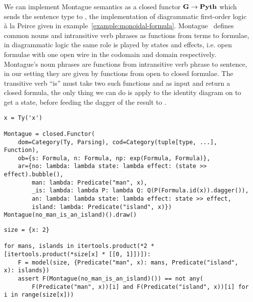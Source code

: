 \begin{example}
We can implement Montague semantics as a closed functor $\mathbf{G} \to \mathbf{Pyth}$ which sends the sentence type to , the implementation of diagrammatic first-order logic à la Peirce given in example~\ref{example:monoidal-formula}.
Montague~\cite{Montague73} defines common nouns and intransitive verb phrases as functions from terms to formulae, in diagrammatic logic the same role is played by states and effects, i.e. open formulae with one open wire  in the codomain and domain respectively.
Montague's noun phrases are functions from intransitive verb phrase to sentence, in our setting they are given by functions from open to closed formulae.
The transitive verb ``is'' must take two such functions  and  as input and return a closed formula, the only thing we can do is apply  to the identity diagram on  to get a state, before feeding the dagger of the result to .

\begin{verbatim}
x = Ty('x')

Montague = closed.Functor(
    dom=Category(Ty, Parsing), cod=Category(tuple[type, ...], Function),
    ob={s: Formula, n: Formula, np: exp(Formula, Formula)},
    ar={no: lambda: lambda state: lambda effect: (state >> effect).bubble(),
        man: lambda: Predicate("man", x),
        _is: lambda: lambda P: lambda Q: Q(P(Formula.id(x)).dagger()),
        an: lambda: lambda state: lambda effect: state >> effect,
        island: lambda: Predicate("island", x)})
Montague(no_man_is_an_island)().draw()
\end{verbatim}


\begin{verbatim}
size = {x: 2}

for mans, islands in itertools.product(*2 * [itertools.product(*size[x] * [[0, 1]])]):
    F = model(size, {Predicate("man", x): mans, Predicate("island", x): islands})
    assert F(Montague(no_man_is_an_island)()) == not any(
        F(Predicate("man", x))[i] and F(Predicate("island", x))[i] for i in range(size[x]))
\end{verbatim}
\end{example}

